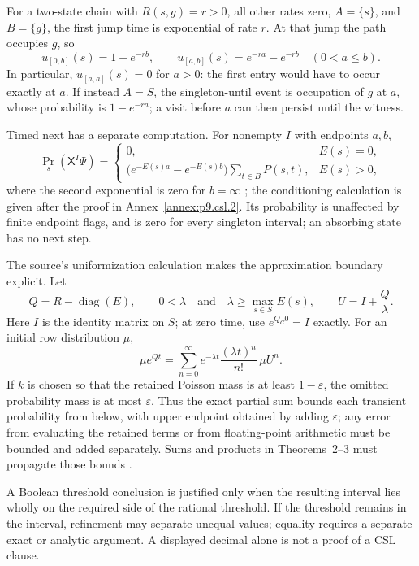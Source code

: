 For a two-state chain with \(R(s,g)=r>0\), all other rates zero,
\(A=\{s\}\), and \(B=\{g\}\), the first jump time is exponential of
rate \(r\).  At that jump the path occupies \(g\), so
\[
 u_{[0,b]}(s)=1-e^{-rb},\qquad
 u_{[a,b]}(s)=e^{-ra}-e^{-rb}\quad(0<a\leq b).
\]
In particular, \(u_{[a,a]}(s)=0\) for \(a>0\): the first entry would
have to occur exactly at \(a\).  If instead \(A=S\), the singleton-until
event is occupation of \(g\) at \(a\), whose probability is
\(1-e^{-ra}\); a visit before \(a\) can then persist until the witness.

Timed next has a separate computation.  For nonempty \(I\) with endpoints
\(a,b\),
\[
 \Pr_s(\mathsf X^I\Psi)=
 \begin{cases}
  0,&E(s)=0,\\
  \bigl(e^{-E(s)a}-e^{-E(s)b}\bigr)
       \displaystyle\sum_{t\in B}P(s,t),&E(s)>0,
 \end{cases}
\]
where the second exponential is zero for \(b=\infty\)
\cite[Prop.~3]{BaierHaverkortHermannsKatoen2003}; the conditioning calculation
is given after the proof in Annex~\ref{annex:p9.csl.2}.
Its probability is unaffected by finite endpoint flags, and is zero for
every singleton interval; an absorbing state has no next step.

The source's uniformization calculation makes the approximation boundary
explicit.  Let
\[
 Q=R-\operatorname{diag}(E),\qquad
 0<\lambda\quad\text{and}\quad\lambda\geq\max_{s\in S}E(s),\qquad
 U=I+\frac{Q}{\lambda}.
\]
Here \(I\) is the identity matrix on \(S\); at zero time, use
\(e^{Q_C0}=I\) exactly.  For an initial row distribution \(\mu\),
\[
 \mu e^{Qt}
 =\sum_{n=0}^{\infty}
   e^{-\lambda t}\frac{(\lambda t)^n}{n!}\,\mu U^n.
\]
If \(k\) is chosen so that the retained Poisson mass is at least
\(1-\varepsilon\), the omitted probability mass is at most \(\varepsilon\).
Thus the exact partial sum bounds each transient probability from below, with
upper endpoint obtained by adding \(\varepsilon\); any error from evaluating
the retained terms or from floating-point arithmetic must be bounded and added
separately.  Sums and products in Theorems~2--3 must propagate those bounds
\cite[\S4.3, eqs.~(7)--(8), and \S6]{BaierHaverkortHermannsKatoen2003}.

A Boolean threshold conclusion is justified only when the resulting interval
lies wholly on the required side of the rational threshold.  If the threshold
remains in the interval, refinement may separate unequal values; equality
requires a separate exact or analytic argument.  A displayed decimal alone is
not a proof of a CSL clause.

